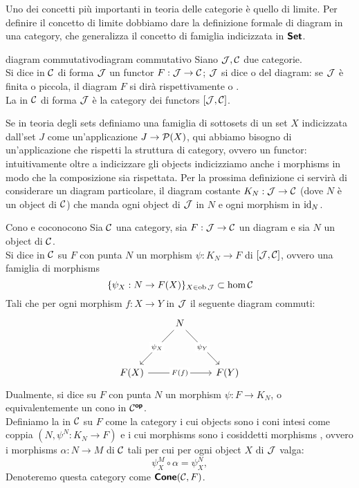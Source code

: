 \documentclass{article}
\renewcommand\C{\mc{C}}
\newcommand\J{\mc{J}}
\begin{document}
Uno dei concetti più importanti in teoria delle categorie è quello di limite. Per definire il concetto di limite dobbiamo dare la definizione formale di diagram in una category, che generalizza il concetto di famiglia indicizzata in $\text{\sffamily\textbf{Set}}$.

\begin{definition}{diagram commutativo}{diagram commutativo}
    Siano $\J, \C$ due categorie.\\
    Si dice  in $\C$ di forma $\J$ un functor $F:\J\to\C$; $\J$ si dice  o  del diagram: se $\J$ è finita o piccola, il diagram $F$ si dirà rispettivamente  o .\\
    La  in $\C$ di forma $\J$ è la category dei functors $[\J,\C]$.
\end{definition}

Se in teoria degli sets definiamo una famiglia di sottosets di un set $X$ indicizzata dall'set $J$ come un'applicazione $J\to \mathcal{P}(X)$, qui abbiamo bisogno di un'applicazione che rispetti la struttura di category, ovvero un functor: intuitivamente oltre a indicizzare gli objects indicizziamo anche i morphisms in modo che la composizione sia rispettata. Per la prossima definizione ci servirà di considerare un diagram particolare, il diagram costante $K_N : \J\to \C$ (dove $N$ è un object di $\C$) che manda ogni object di $\J$ in $N$ e ogni morphism in $\operatorname{id}_N$.

\begin{definition}{Cono e cocono}{cono}
    Sia $\C$ una category, sia $F: \J\to\C$ un diagram e sia $N$ un object di $\C$.\\
    Si dice  in $\C$ su $F$ con punta $N$ un morphism $\psi : K_N \to F$ di $[\J,\C]$, ovvero una famiglia di morphisms \[\{\psi_X : N\to F(X)\}_{X \in \ob\J} \subset \hom\C\]
    Tali che per ogni morphism $f:X\to Y$ in $\J$ il seguente diagram commuti:
    \[\begin{tikzcd}
    	& N \\
    	\\
    	{F(X)} && {F(Y)}
    	\arrow["{\psi_X}"{description}, from=1-2, to=3-1]
    	\arrow["{\psi_Y}"{description}, from=1-2, to=3-3]
	    \arrow["{F(f)}"{description}, from=3-1, to=3-3]
    \end{tikzcd}\]
    Dualmente, si dice  su $F$ con punta $N$ un morphism $\psi : F \to K_N$, o equivalentemente un cono in $\C^\op$.\\
    Definiamo la  in $\C$ su $F$ come la category i cui objects sono i coni intesi come coppia $(N, \psi^N: K_N \to F )$ e i cui morphisms sono i cosiddetti morphisms , ovvero i morphisms $\alpha : N\to M$ di $\C$ tali per cui per ogni object $X$ di $\J$ valga:
    \[\psi^M_X\circ \alpha = \psi^N_X,\]
    Denoteremo questa category come $\cone(\C,F)$.
\end{definition}
\end{document}
